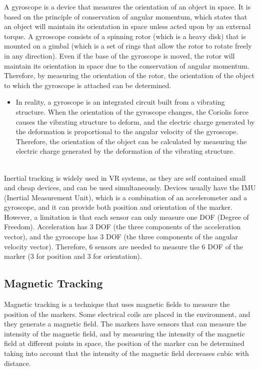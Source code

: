 A gyroscope is a device that measures the orientation of an object in space. It is based on the principle of conservation of angular momentum, which states that an object will maintain its orientation in space unless acted upon by an external torque. A gyroscope consists of a spinning rotor (which is a heavy disk) that is mounted on a gimbal (which is a set of rings that allow the rotor to rotate freely in any direction). Even if the base of the gyroscope is moved, the rotor will maintain its orientation in space due to the conservation of angular momentum. Therefore, by measuring the orientation of the rotor, the orientation of the object to which the gyroscope is attached can be determined.
\begin{itemize}
    \item In reality, a gyroscope is an integrated circuit built from a vibrating structure. When the orientation of the gyroscope changes, the Coriolis force causes the vibrating structure to deform, and the electric charge generated by the deformation is proportional to the angular velocity of the gyroscope. Therefore, the orientation of the object can be calculated by measuring the electric charge generated by the deformation of the vibrating structure.
\end{itemize}~\\

Inertial tracking is widely used in VR systems, as they are self contained small and cheap devices, and can be used simultaneously. Devices usually have the IMU (Inertial Measurement Unit), which is a combination of an accelerometer and a gyroscope, and it can provide both position and orientation of the marker. However, a limitation is that each sensor can only measure one DOF (Degree of Freedom). Acceleration has $3$ DOF (the three components of the acceleration vector), and the gyroscope has $3$ DOF (the three components of the angular velocity vector). Therefore, 6 sensors are needed to measure the 6 DOF of the marker (3 for position and 3 for orientation).
\subsection{Magnetic Tracking}

Magnetic tracking is a technique that uses magnetic fields to measure the position of the markers. Some electrical coils are placed in the environment, and they generate a magnetic field. The markers have sensors that can measure the intensity of the magnetic field, and by measuring the intensity of the magnetic field at different points in space, the position of the marker can be determined taking into account that the intensity of the magnetic field decreases cubic with distance. 

